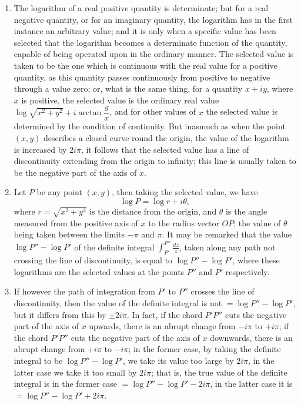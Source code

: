 \documentclass[12pt,a4paper]{article}
\theoremstyle{plain}
\theoremstyle{definition}
\theoremstyle{remark}
\begin{document}
\begin{enumerate}[label=\arabic*.]
\item The logarithm of a real positive quantity is determinate; but for a real negative quantity, or for an imaginary quantity, the logarithm has in the first instance an arbitrary value; and it is only when a specific value has been selected that the logarithm becomes a determinate function of the quantity, capable of being operated upon in the ordinary manner. The selected value is taken to be the one which is continuous with the real value for a positive quantity, as this quantity passes continuously from positive to negative through a value zero; or, what is the same thing, for a quantity $x + iy$, where $x$ is positive, the selected value is the ordinary real value $\log\sqrt{x^2 + y^2} + i\arctan\dfrac{y}{x}$, and for other values of $x$ the selected value is determined by the condition of continuity. But inasmuch as when the point $(x,y)$ describes a closed curve round the origin, the value of the logarithm is increased by $2i\pi$, it follows that the selected value has a line of discontinuity extending from the origin to infinity; this line is usually taken to be the negative part of the axis of $x$.

\item Let $P$ be any point $(x, y)$, then taking the selected value, we have
\[\log P = \log r + i\theta,\]
where $r = \sqrt{x^2 + y^2}$ is the distance from the origin, and $\theta$ is the angle measured from the positive axis of $x$ to the radius vector $OP$; the value of $\theta$ being taken between the limits $-\pi$ and $\pi$. It may be remarked that the value $\log P'' - \log P'$ of the definite integral $\displaystyle\int_{P'}^{P''} \frac{dz}{z}$, taken along any path not crossing the line of discontinuity, is equal to $\log P'' - \log P'$, where these logarithms are the selected values at the points $P''$ and $P'$ respectively.

\item If however the path of integration from $P'$ to $P''$ crosses the line of discontinuity, then the value of the definite integral is not $= \log P'' - \log P'$, but it differs from this by $\pm 2i\pi$. In fact, if the chord $P'P''$ cuts the negative part of the axis of $x$ upwards, there is an abrupt change from $-i\pi$ to $+i\pi$; if the chord $P'P''$ cuts the negative part of the axis of $x$ downwards, there is an abrupt change from $+i\pi$ to $-i\pi$; in the former case, by taking the definite integral to be $\log P'' - \log P'$, we take its value too large by $2i\pi$, in the latter case we take it too small by $2i\pi$; that is, the true value of the definite integral is in the former case $= \log P'' - \log P' - 2i\pi$, in the latter case it is $= \log P'' - \log P' + 2i\pi$.


\end{enumerate}
\end{document}

